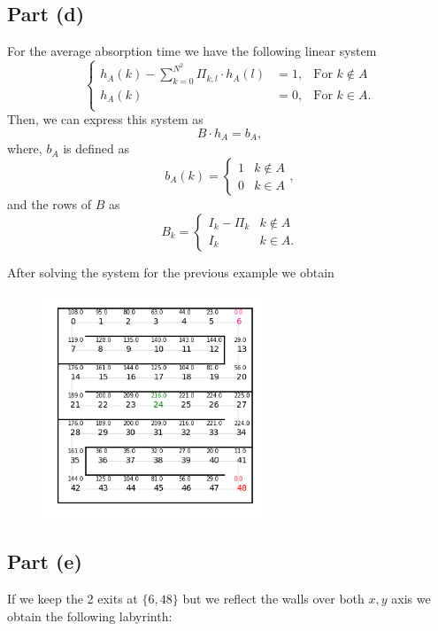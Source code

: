 \subsection*{Part (d)}
For the average absorption time we have the following linear system
\[ \left\{\begin{array}{ccl}
    h_A(k) - \sum_{k = 0}^{N^2} \Pi_{k,l} \cdot h_A(l)  & = 1, & \mbox{For }k \not\in A\\
    h_A(k) & = 0, & \mbox{For }k \in A.\\
\end{array}\right. \]
Then, we can express this system as
\[ B\cdot h_A = b_A, \]
where, $b_A$ is defined as
\[ b_A(k) = \begin{cases}
    1 & k \not\in A\\
    0 & k\in A
\end{cases}, \]
and the rows of $B$ as
\[ B_k = \begin{cases}
    I_k - \Pi_k & k \not\in A\\
    I_k & k \in A.
\end{cases} \]

After solving the system for the previous example we obtain
\begin{figure}[H]
    \centering
    \includegraphics[width=0.6\textwidth]{../pictures/216-2.png}
\end{figure}

\subsection*{Part (e)}

If we keep the 2 exits at $\{6,48\}$ but we reflect the walls over both $x,y$ axis we obtain the following labyrinth:

